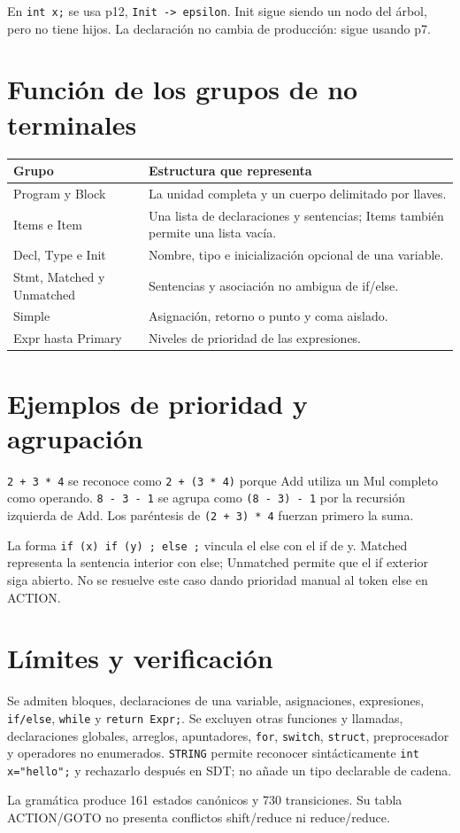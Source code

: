 En \texttt{int x;} se usa p12, \texttt{Init -> epsilon}. Init sigue siendo un nodo del árbol, pero no tiene hijos. La declaración no cambia de producción: sigue usando p7.
\clearpage\section*{Función de los grupos de no terminales}
\begin{tabularx}{\linewidth}{@{}p{4.3cm}X@{}}\toprule Grupo & Estructura que representa\\\midrule
Program y Block & La unidad completa y un cuerpo delimitado por llaves.\\
Items e Item & Una lista de declaraciones y sentencias; Items también permite una lista vacía.\\
Decl, Type e Init & Nombre, tipo e inicialización opcional de una variable.\\
Stmt, Matched y Unmatched & Sentencias y asociación no ambigua de if/else.\\
Simple & Asignación, retorno o punto y coma aislado.\\
Expr hasta Primary & Niveles de prioridad de las expresiones.\\\bottomrule\end{tabularx}
\section*{Ejemplos de prioridad y agrupación}
\texttt{2 + 3 * 4} se reconoce como \texttt{2 + (3 * 4)} porque Add utiliza un Mul completo como operando. \texttt{8 - 3 - 1} se agrupa como \texttt{(8 - 3) - 1} por la recursión izquierda de Add. Los paréntesis de \texttt{(2 + 3) * 4} fuerzan primero la suma.

La forma \texttt{if (x) if (y) ; else ;} vincula el else con el if de y. Matched representa la sentencia interior con else; Unmatched permite que el if exterior siga abierto. No se resuelve este caso dando prioridad manual al token else en ACTION.

\section*{Límites y verificación}
Se admiten bloques, declaraciones de una variable, asignaciones, expresiones, \texttt{if/else}, \texttt{while} y \texttt{return Expr;}. Se excluyen otras funciones y llamadas, declaraciones globales, arreglos, apuntadores, \texttt{for}, \texttt{switch}, \texttt{struct}, preprocesador y operadores no enumerados. \texttt{STRING} permite reconocer sintácticamente \texttt{int x="hello";} y rechazarlo después en SDT; no añade un tipo declarable de cadena.

La gramática produce 161 estados canónicos y 730 transiciones. Su tabla ACTION/GOTO no presenta conflictos shift/reduce ni reduce/reduce.

